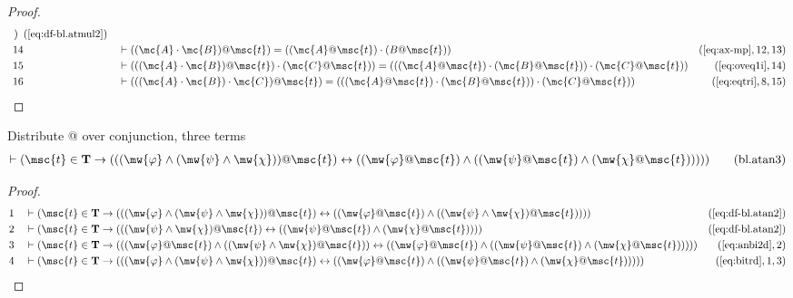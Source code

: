 \begin{proof}
\begin{align}
\begin{array}{c}
     )
     \end{array}
     &(\mbox{\ref{eq:df-bl.atmul2}})\notag
  \\ 14 &&  & \vdash ( ( \mc{A} \cdot \mc{B} ) @ \msc{t} ) = ( ( \mc{A} @ \msc{t} ) \cdot ( B
     @ \msc{t} ) )&(\mbox{\ref{eq:ax-mp}},12,13)\notag
  \\ 15 &&  & \vdash ( ( ( \mc{A} \cdot \mc{B} ) @ \msc{t} ) \cdot ( \mc{C} @ \msc{t} ) ) = (
     ( ( \mc{A} @ \msc{t} ) \cdot ( \mc{B} @ \msc{t} ) ) \cdot ( \mc{C} @
     \msc{t} ) )&(\mbox{\ref{eq:oveq1i}},14)\notag
  \\ 16 &&  & \vdash ( ( ( \mc{A} \cdot \mc{B} ) \cdot \mc{C} ) @ \msc{t} ) = ( ( ( \mc{A} @
     \msc{t} ) \cdot ( \mc{B} @ \msc{t} ) ) \cdot ( \mc{C} @ \msc{t}
     ) )&(\mbox{\ref{eq:eqtri}},8,15)\notag
\end{align}
\end{proof}

\begin{lemma} {Distribute @ over conjunction, three terms}
\begin{align}
\vdash ( \msc{t} \in \mathbf{T} \rightarrow ( ( ( \mw{\varphi} \wedge (
    \mw{\psi} \wedge \mw{\chi} ) ) @ \msc{t} ) \leftrightarrow ( ( \mw{\varphi}
    @ \msc{t} ) \wedge ( ( \mw{\psi} @ \msc{t} ) \wedge ( \mw{\chi} @ \msc{t} )
    ) ) ) )\label{eq:bl.atan3}\tag{bl.atan3}
\end{align}
\end{lemma}


\begin{proof}
\begin{align}
  1 &&  & \vdash ( \msc{t} \in \mathbf{T} \rightarrow ( ( ( \mw{\varphi} \wedge
     ( \mw{\psi} \wedge \mw{\chi} ) ) @ \msc{t} )
     \leftrightarrow ( ( \mw{\varphi} @ \msc{t} ) \wedge (
     ( \mw{\psi} \wedge \mw{\chi} ) @ \msc{t} ) ) )
     )&(\mbox{\ref{eq:df-bl.atan2}})\notag
  \\ 2 &&  & \vdash ( \msc{t} \in \mathbf{T} \rightarrow ( ( ( \mw{\psi} \wedge
     \mw{\chi} ) @ \msc{t} ) \leftrightarrow ( ( \mw{\psi}
     @ \msc{t} ) \wedge ( \mw{\chi} @ \msc{t} ) ) )
     )&(\mbox{\ref{eq:df-bl.atan2}})\notag
  \\ 3 &&  & \vdash ( \msc{t} \in \mathbf{T} \rightarrow ( ( ( \mw{\varphi} @
     \msc{t} ) \wedge ( ( \mw{\psi} \wedge \mw{\chi} ) @
     \msc{t} ) ) \leftrightarrow ( ( \mw{\varphi} @
     \msc{t} ) \wedge ( ( \mw{\psi} @ \msc{t} ) \wedge (
     \mw{\chi} @ \msc{t} ) ) ) )
     )&(\mbox{\ref{eq:anbi2d}},2)\notag
  \\ 4 &&  & \vdash ( \msc{t} \in \mathbf{T} \rightarrow ( ( ( \mw{\varphi}
     \wedge ( \mw{\psi} \wedge \mw{\chi} ) ) @ \msc{t} )
     \leftrightarrow ( ( \mw{\varphi} @ \msc{t} ) \wedge (
     ( \mw{\psi} @ \msc{t} ) \wedge ( \mw{\chi} @ \msc{t}
     ) ) ) ) )&(\mbox{\ref{eq:bitrd}},1,3)\notag
\end{align}
\end{proof}

